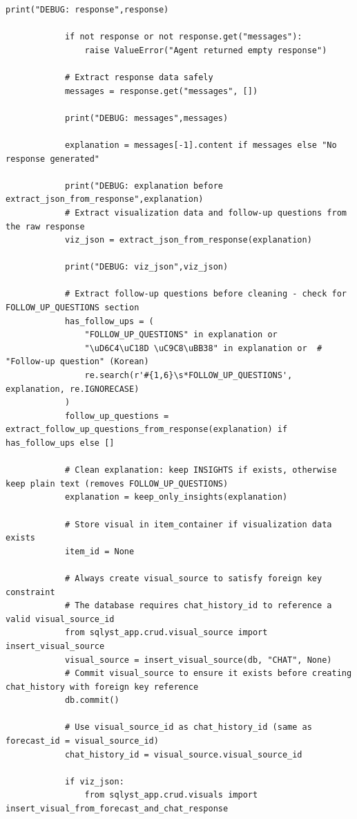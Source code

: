 \begin{lstlisting}[style=python, numbers=none, caption={Text2SQL chat service (\code{text2sql\_service.py})}, label={lst:text2sql-service}]
            print("DEBUG: response",response)

            if not response or not response.get("messages"):
                raise ValueError("Agent returned empty response")

            # Extract response data safely
            messages = response.get("messages", [])

            print("DEBUG: messages",messages)

            explanation = messages[-1].content if messages else "No response generated"

            print("DEBUG: explanation before extract_json_from_response",explanation)
            # Extract visualization data and follow-up questions from the raw response
            viz_json = extract_json_from_response(explanation)

            print("DEBUG: viz_json",viz_json)

            # Extract follow-up questions before cleaning - check for FOLLOW_UP_QUESTIONS section
            has_follow_ups = (
                "FOLLOW_UP_QUESTIONS" in explanation or
                "\uD6C4\uC18D \uC9C8\uBB38" in explanation or  # "Follow-up question" (Korean)
                re.search(r'#{1,6}\s*FOLLOW_UP_QUESTIONS', explanation, re.IGNORECASE)
            )
            follow_up_questions = extract_follow_up_questions_from_response(explanation) if has_follow_ups else []

            # Clean explanation: keep INSIGHTS if exists, otherwise keep plain text (removes FOLLOW_UP_QUESTIONS)
            explanation = keep_only_insights(explanation)

            # Store visual in item_container if visualization data exists
            item_id = None

            # Always create visual_source to satisfy foreign key constraint
            # The database requires chat_history_id to reference a valid visual_source_id
            from sqlyst_app.crud.visual_source import insert_visual_source
            visual_source = insert_visual_source(db, "CHAT", None)
            # Commit visual_source to ensure it exists before creating chat_history with foreign key reference
            db.commit()

            # Use visual_source_id as chat_history_id (same as forecast_id = visual_source_id)
            chat_history_id = visual_source.visual_source_id

            if viz_json:
                from sqlyst_app.crud.visuals import insert_visual_from_forecast_and_chat_response


\end{lstlisting}
